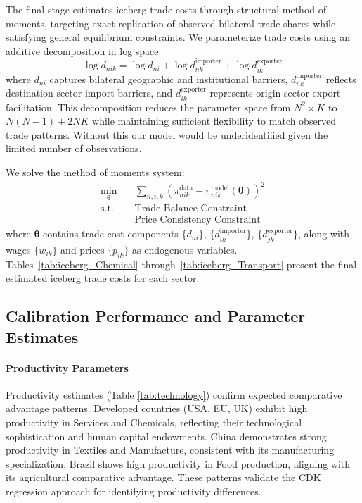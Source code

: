 The final stage estimates iceberg trade costs through structural method of moments, targeting exact replication of observed bilateral trade shares while satisfying general equilibrium constraints. We parameterize trade costs using an additive decomposition in log space:
\begin{equation}
\log d_{nik} = \log d_{ni} + \log d_{nk}^{\text{importer}} + \log d_{ik}^{\text{exporter}}
\end{equation}
where $d_{ni}$ captures bilateral geographic and institutional barriers, $d_{nk}^{\text{importer}}$ reflects destination-sector import barriers, and $d_{ik}^{\text{exporter}}$ represents origin-sector export facilitation. This decomposition reduces the parameter space from $N^2 \times K$ to $N(N-1) + 2NK$ while maintaining sufficient flexibility to match observed trade patterns. Without this our model would be underidentified given the limited number of observations.

We solve the method of moments system:
\begin{align*}
\min_{\boldsymbol{\theta}} &\quad \sum_{n,i,k} \left( \pi_{nik}^{\text{data}} - \pi_{nik}^{\text{model}}(\boldsymbol{\theta}) \right)^2 \\
\text{s.t.} & \quad \text{Trade Balance Constraint} \\
& \quad \text{Price Consistency Constraint}
\end{align*}
where $\boldsymbol{\theta}$ contains trade cost components $\{d_{ni}\}$, $\{d_{ik}^{\text{importer}}\}$, $\{d_{jk}^{\text{exporter}}\}$, along with wages $\{w_{ik}\}$ and prices $\{p_{ik}\}$ as endogenous variables. Tables~\ref{tab:iceberg_Chemical} through~\ref{tab:iceberg_Transport} present the final estimated iceberg trade costs for each sector. 

\subsection{Calibration Performance and Parameter Estimates}

\paragraph{Productivity Parameters} Productivity estimates (Table \ref{tab:technology}) confirm expected comparative advantage patterns. Developed countries (USA, EU, UK) exhibit high productivity in Services and Chemicals, reflecting their technological sophistication and human capital endowments. China demonstrates strong productivity in Textiles and Manufacture, consistent with its manufacturing specialization. Brazil shows high productivity in Food production, aligning with its agricultural comparative advantage. These patterns validate the CDK regression approach for identifying productivity differences.

